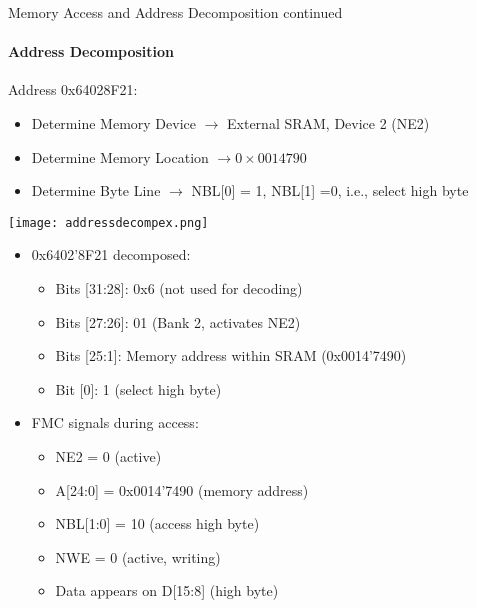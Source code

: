 \begin{example2}{Memory Access and Address Decomposition continued}
    \paragraph{Address Decomposition}
    Address 0x64028F21:
    \begin{itemize}
        \item Determine Memory Device $\rightarrow$ External SRAM, Device 2 (NE2)
        \item Determine Memory Location $\rightarrow 0 \times 0014790$
        \item Determine Byte Line $\rightarrow$ NBL[0] = 1, NBL[1] =0, i.e., select high byte
    \end{itemize}
    \texttt{[image: addressdecompex.png]}
       \begin{itemize}
     \item 0x6402'8F21 decomposed:
     \begin{itemize}
       \item Bits [31:28]: 0x6 (not used for decoding)
       \item Bits [27:26]: 01 (Bank 2, activates NE2)
       \item Bits [25:1]: Memory address within SRAM (0x0014'7490)
       \item Bit [0]: 1 (select high byte)
     \end{itemize}
     \item FMC signals during access:
     \begin{itemize}
       \item NE2 = 0 (active)
       \item A[24:0] = 0x0014'7490 (memory address)
       \item NBL[1:0] = 10 (access high byte)
       \item NWE = 0 (active, writing)
       \item Data appears on D[15:8] (high byte)
     \end{itemize}
   \end{itemize}
\end{example2}



